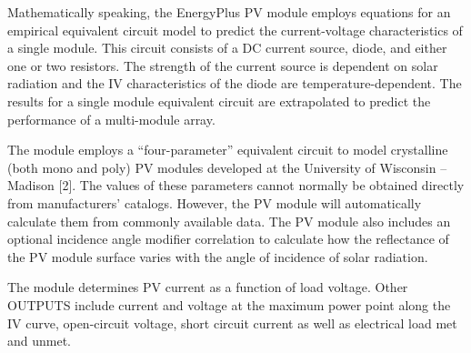 Mathematically speaking, the EnergyPlus PV module employs equations for an empirical equivalent circuit model to predict the current-voltage characteristics of a single module. This circuit consists of a DC current source, diode, and either one or two resistors. The strength of the current source is dependent on solar radiation and the IV characteristics of the diode are temperature-dependent. The results for a single module equivalent circuit are extrapolated to predict the performance of a multi-module array.

The module employs a ``four-parameter'' equivalent circuit to model crystalline (both mono and poly) PV modules developed at the University of Wisconsin -- Madison {[}2{]}. The values of these parameters cannot normally be obtained directly from manufacturers' catalogs. However, the PV module will automatically calculate them from commonly available data. The PV module also includes an optional incidence angle modifier correlation to calculate how the reflectance of the PV module surface varies with the angle of incidence of solar radiation.

The module determines PV current as a function of load voltage. Other OUTPUTS include current and voltage at the maximum power point along the IV curve, open-circuit voltage, short circuit current as well as electrical load met and unmet.

